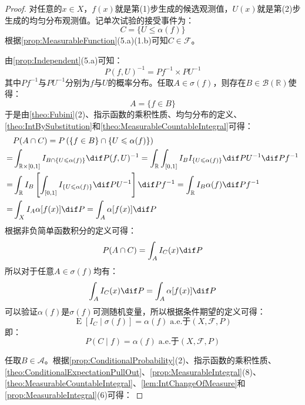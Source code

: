 \begin{proof}
	对任意的$x\in X$，$f(x)$就是第(1)步生成的候选观测值，$U(x)$就是第(2)步生成的均匀分布观测值。记单次试验的接受事件为：
	\begin{equation*}
		C=\{U\leqslant\alpha(f)\}
	\end{equation*}
	根据\cref{prop:MeasurableFunction}(5.a)(1.b)可知$C\in\mathscr{F}$。\par
	由\cref{prop:Independent}(5.a)可知：
	\begin{equation*}
		P(f,U)^{-1}=Pf^{-1}\times PU^{-1}
	\end{equation*}
	其中$Pf^{-1}$与$PU^{-1}$分别为$f$与$U$的概率分布。任取$A\in\sigma(f)$，则存在$B\in\mathcal{B}(\mathbb{R})$使得：
	\begin{equation*}
		A=\{f\in B\}
	\end{equation*}
	于是由\cref{theo:Fubini}(2)、指示函数的乘积性质、均匀分布的定义、\cref{theo:IntBySubstitution}和\cref{theo:MeasurableCountableIntegral}可得：
	\begin{align*}
		&P(A\cap C)=P\left(\{f\in B\}\cap\{U\leqslant\alpha(f)\}\right) \\
		=&\int_{\mathbb{R}\times[0,1]}I_{B\cap\{U\leqslant\alpha(f)\}}\dif P(f,U)^{-1}=\int_{\mathbb{R}}\int_{[0,1]}I_{B}I_{\{U\leqslant\alpha(f)\}}\dif PU^{-1}\dif Pf^{-1} \\
		=&\int_{\mathbb{R}}I_{B}\left[\int_{[0,1]}I_{\{U\leqslant\alpha(f)\}}\dif PU^{-1}\right]\dif Pf^{-1}=\int_{\mathbb{R}}I_{B}\alpha(f)\dif Pf^{-1} \\
		=&\int_{X}I_{A}\alpha[f(x)]\dif P=\int_{A}\alpha[f(x)]\dif P
	\end{align*}
	根据非负简单函数积分的定义可得：
	\begin{equation*}
		P(A\cap C)=\int_{A}I_C(x)\dif P
	\end{equation*}
	所以对于任意$A\in\sigma(f)$均有：
	\begin{equation*}
		\int_{A}I_C(x)\dif P=\int_{A}\alpha[f(x)]\dif P
	\end{equation*}
	可以验证$\alpha(f)$是$\sigma(f)$可测随机变量，所以根据条件期望的定义可得：
	\begin{equation*}
		\operatorname{E}\left[I_C\mid\sigma(f)\right]=\alpha(f)\;\text{a.e.于$(X,\mathscr{F},P)$}
	\end{equation*}
	即：
	\begin{equation*}
		P(C\mid f)=\alpha(f)\;\text{a.e.于$(X,\mathscr{F},P)$}
	\end{equation*}\par
	任取$B\in\mathscr{A}$。根据\cref{prop:ConditionalProbability}(2)、指示函数的乘积性质、\cref{theo:ConditionalExpectationPullOut}、\cref{prop:MeasurableIntegral}(8)、\cref{theo:MeasurableCountableIntegral}、\cref{lem:IntChangeOfMeasure}和\cref{prop:MeasurableIntegral}(6)可得：

\end{proof}

